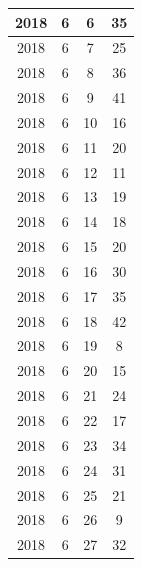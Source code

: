 \begin{longtable} {|c|c|c|c|}
\hline
2018         & 6            & 6            & 35                        \\ 
\hline
2018         & 6            & 7            & 25                        \\ 
\hline
2018         & 6            & 8            & 36                        \\ 
\hline
2018         & 6            & 9            & 41                        \\ 
\hline
2018         & 6            & 10           & 16                        \\ 
\hline
2018         & 6            & 11           & 20                        \\ 
\hline
2018         & 6            & 12           & 11                        \\ 
\hline
2018         & 6            & 13           & 19                        \\ 
\hline
2018         & 6            & 14           & 18                        \\ 
\hline
2018         & 6            & 15           & 20                        \\ 
\hline
2018         & 6            & 16           & 30                        \\ 
\hline
2018         & 6            & 17           & 35                        \\ 
\hline
2018         & 6            & 18           & 42                        \\ 
\hline
2018         & 6            & 19           & 8                         \\ 
\hline
2018         & 6            & 20           & 15                        \\ 
\hline
2018         & 6            & 21           & 24                        \\ 
\hline
2018         & 6            & 22           & 17                        \\ 
\hline
2018         & 6            & 23           & 34                        \\ 
\hline
2018         & 6            & 24           & 31                        \\ 
\hline
2018         & 6            & 25           & 21                        \\ 
\hline
2018         & 6            & 26           & 9                         \\ 
\hline
2018         & 6            & 27           & 32                        \\ 

\end{longtable}
